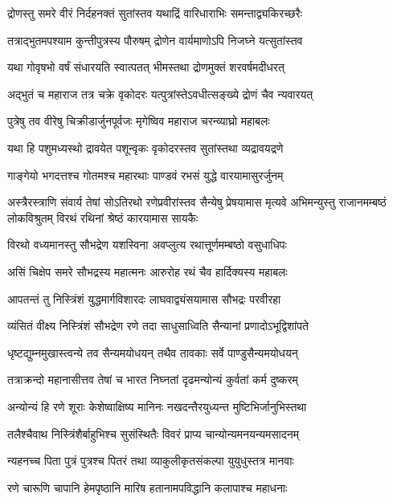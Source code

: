 \twolineshloka
{द्रोणस्तु समरे वीरं निर्दहनक्तं सुतांस्तव}
{यथाद्रिं वारिधाराभिः समन्ताद्व्यकिरच्छरैः}


\twolineshloka
{तत्राद्भुतमपश्याम कुन्तीपुत्रस्य पौरुषम्}
{द्रोणेन वार्यमाणोऽपि निजघ्ने यत्सुतांस्तव}


\twolineshloka
{यथा गोवृषभो वर्षं संधारयति स्वात्पतत्}
{भीमस्तथा द्रोणमुक्तं शरवर्षमदीधरत्}


\twolineshloka
{अद्भुतं च महाराज तत्र चक्रे वृकोदरः}
{यत्पुत्रांस्तेऽवधीत्सङ्ख्ये द्रोणं चैव न्यवारयत्}


\twolineshloka
{पुत्रेषु तव वीरेषु चिक्रीडार्जुनपूर्वजः}
{मृगेष्विव महाराज चरन्व्याघ्रो महाबलः}


\twolineshloka
{यथा हि पशुमध्यस्थो द्रावयेत पशून्वृकः}
{वृकोदरस्तव सुतांस्तथा व्यद्रावयद्रणे}


\twolineshloka
{गाङ्गेयो भगदत्तश्च गोतमश्च महारथाः}
{पाण्डवं रभसं युद्धे वारयामासुरर्जुनम्}


अस्त्रैरस्त्राणि संवार्य तेषां सोऽतिरथो रणेप्रवीरांस्तव सैन्येषु प्रेषयामास मृत्यवे
\twolineshloka
{अभिमन्युस्तु राजानमम्बष्ठं लोकविश्रुतम्}
{विरथं रथिनां श्रेष्ठं कारयामास सायकैः}


\twolineshloka
{विरथो वध्यमानस्तु सौभद्रेण यशस्विना}
{अवप्लुत्य रथात्तूर्णमम्बष्ठो वसुधाधिपः}


\twolineshloka
{असिं चिक्षेप समरे सौभद्रस्य महात्मनः}
{आरुरोह रथं चैव हार्दिक्यस्य महाबलः}


\twolineshloka
{आपतन्तं तु निस्त्रिंशं युद्धमार्गविशारदः}
{लाघवाद्व्यंसयामास सौभद्रः परवीरहा}


\twolineshloka
{व्यंसितं वीक्ष्य निस्त्रिंशं सौभद्रेण रणे तदा}
{साधुसाध्विति सैन्यानां प्रणादोऽभूद्विशांपते}


\twolineshloka
{धृष्टद्युम्नमुखास्त्वन्ये तव सैन्यमयोधयन्}
{तथैव तावकाः सर्वे पाण्डुसैन्यमयोधयन्}


\twolineshloka
{तत्राक्रन्दो महानासीत्तव तेषां च भारत}
{निघ्नतां दृढमन्योन्यं कुर्वतां कर्म दुष्करम्}


\twolineshloka
{अन्योन्यं हि रणे शूराः केशेष्वाक्षिष्य मानिनः}
{नखदन्तैरयुध्यन्त मुष्टिभिर्जानुभिस्तथा}


\twolineshloka
{तलैश्चैवाथ निस्त्रिंशैर्बाहुभिश्च सुसंस्थितैः}
{विवरं प्राप्य चान्योन्यमनयन्यमसादनम्}


\twolineshloka
{न्यहनच्च पिता पुत्रं पुत्रश्च पितरं तथा}
{व्याकुलीकृतसंकल्पा युयुधुस्तत्र मानवाः}


\twolineshloka
{रणे चारूणि चापानि हेमपृष्ठानि मारिष}
{हतानामपविद्धानि कलापाश्च महाधनाः}


